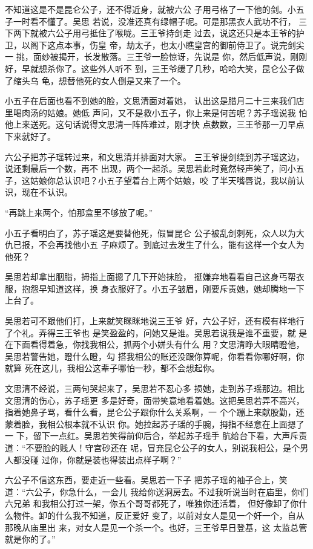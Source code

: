 不知道这是不是昆仑公子，还不得近身，就被六公
子用弓格了一下他的剑。小五子一时看不懂了。吴思
若说，没准还真有绿帽子呢。可是那黑衣人武功不行，
三下两下就被六公子用弓抵住了喉咙。三王爷持剑走
过去，说这还只是本王爷的护卫，以阁下这点本事，伤皇
帝，劫太子，也太小瞧皇宫的御前侍卫了。说完剑尖一
挑，面纱被揭开，长发散落。三王爷一脸惊讶，先说是
你，然后低声说，刚刚好，早就想杀你了。这些外人听不
到，三王爷缓了几秒，哈哈大笑，昆仑公子做了缩头乌
龟，想替他死的女人倒是又来了一个。

小五子在后面也看不到她的脸，文思清面对着她，
认出这是腊月二十三来我们店里喝肉汤的姑娘。她低
声问，又不是救小五子，你上来是何苦呢？苏子瑶说我
怕他上来送死。这句话说得文思清一阵阵难过，刚才快
点数数，三王爷那一刀早点下来就好了。

六公子把苏子瑶转过来，和文思清并排面对大家。
三王爷提剑绕到苏子瑶这边，说还剩最后一个数，再不
出现，两个一起杀。吴思若此时竟然轻声笑了，问小五
子，这姑娘你总认识吧？小五子望着台上两个姑娘，咬
了半天嘴唇说，我以前认识，现在不认识。

“再跳上来两个，怕那盒里不够放了呢。”

小五子看明白了，苏子瑶这是要替他死，假冒昆仑
公子被乱剑刺死，众人以为大仇已报，不会再找他小五
子麻烦了。到底过去发生了什么，能有这样一个女人为
他死？

吴思若却拿出胭脂，拇指上面摁了几下开始抹脸，
挺嫌弃地看看自己这身丐帮衣服，抱怨早知道这样，换
身衣服好了。小五子皱眉，刚要斥责她，她却腾地一下
上台了。

吴思若可不跟他们打，上来就笑眯眯地说三王爷
好，六公子好，还有模有样地行了个礼。弄得三王爷也
是笑盈盈的，问她又是谁。吴思若说我是谁不重要，就
是在下面看得着急，你找我相公，抓两个小姘头有什么
用？文思清睁大眼睛瞪他，吴思若警告她，瞪什么瞪，勾
搭我相公的账还没跟你算呢，你看看你哪好啊，你就算
死在这儿，我相公这辈子哪怕一秒，都不会想起你。

文思清不经说，三两句哭起来了，吴思若不忍心多
损她，走到苏子瑶那边。相比文思清的伤心，苏子瑶更
多是好奇，面带笑意地看着她。这把吴思若弄不高兴，
指着她鼻子骂，看什么看，昆仑公子跟你什么关系啊，一
个个蹦上来献股勤，还蒙着脸，我相公根本就不认识
你。她拉起苏子瑶的手腕，拇指不经意在上面摁了一
下，留下一点红。吴思若笑得前仰后合，举起苏子瑶手
肮给台下看，大声斥责道：“不要脸的贱人！守宫砂还在
呢，冒充昆仑公子的女人，别说我相公，是个男人都没碰
过你，你就是装也得装出点样子啊？”

六公子不信这东西，要走近一些看。吴思若一下子
把苏子瑶的袖子合上，笑道：“六公子，你急什么，一会儿
我给你送洞房去。不过我听说当时在庙里，你们六兄弟
和我相公打过一架，你五个哥哥都死了，唯独你还活着，
但好像卸了你什么物件。卸的什么我不知道，反正爱好
变了，以前对女人是见一个奸一个，自从那晚从庙里出
来，对女人是见一个杀一个。也好，三王爷早日登基，这
太监总管就是你的了。”

